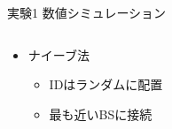 \documentclass[unicode,12pt,aspectratio=169, dvipdfmx]{beamer}
\begin{document}
    \begin{frame}{実験1 数値シミュレーション}
        \begin{columns}
            \begin{column}[T]{.7\linewidth}
                \begin{itemize}
                \item ナイーブ法
                    \begin{itemize}
                        \item IDはランダムに配置
                        \item 最も近いBSに接続
                    \end{itemize}
                \end{itemize}          
            \end{column}
            \begin{column}[T]{.5\linewidth}
            \end{column}
        \end{columns}
    \end{frame}
\end{document}
